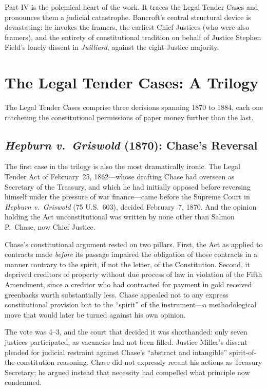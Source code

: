 \documentclass[12pt]{article}
\begin{document}
Part IV is the polemical heart of the work. It traces the Legal Tender
Cases and pronounces them a judicial catastrophe. Bancroft's central
structural device is devastating: he invokes the framers, the earliest
Chief Justices (who were also framers), and the entirety of constitutional
tradition on behalf of Justice Stephen Field's lonely dissent in
\textit{Juilliard}, against the eight-Justice majority.

\section{The Legal Tender Cases: A Trilogy}

The Legal Tender Cases comprise three decisions spanning 1870 to 1884,
each one ratcheting the constitutional permissions of paper money further
than the last.

\subsection{\textit{Hepburn v.\ Griswold} (1870): Chase's Reversal}

The first case in the trilogy is also the most dramatically ironic.
The Legal Tender Act of February~25, 1862---whose drafting Chase had
overseen as Secretary of the Treasury, and which he had initially opposed
before reversing himself under the pressure of war finance---came before
the Supreme Court in \textit{Hepburn v.\ Griswold} (75 U.S.\ 603),
decided February~7, 1870. And the opinion holding the Act unconstitutional
was written by none other than Salmon P.\ Chase, now Chief Justice.

Chase's constitutional argument rested on two pillars. First, the Act
as applied to contracts made \textit{before} its passage impaired the
obligation of those contracts in a manner contrary to the spirit, if
not the letter, of the Constitution. Second, it deprived creditors of
property without due process of law in violation of the Fifth Amendment,
since a creditor who had contracted for payment in gold received
greenbacks worth substantially less. Chase appealed not to any express
constitutional provision but to the ``spirit'' of the instrument---a
methodological move that would later be turned against his own opinion.

The vote was 4--3, and the court that decided it was shorthanded: only
seven justices participated, as vacancies had not been filled. Justice
Miller's dissent pleaded for judicial restraint against Chase's
``abstract and intangible'' spirit-of-the-constitution reasoning. Chase
did not expressly recant his actions as Treasury Secretary; he argued
instead that necessity had compelled what principle now condemned.
\end{document}
